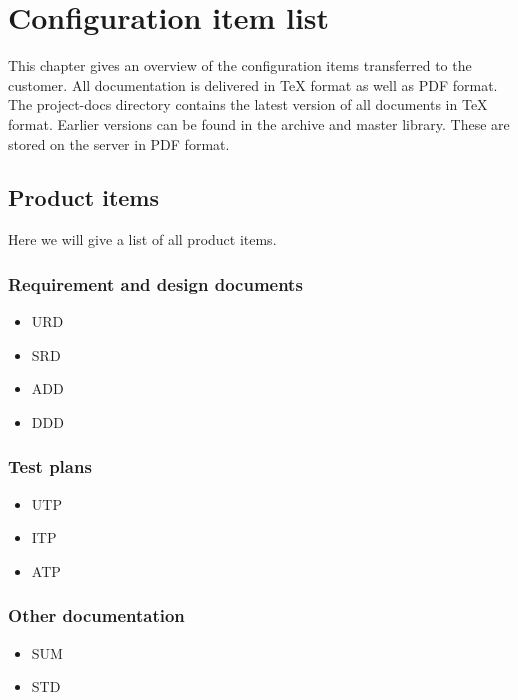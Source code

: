 \chapter{Configuration item list}
\label{chap:conf}
This chapter gives an overview of the configuration items transferred to the customer. All
documentation is delivered in \TeX{} format as well as PDF format. The project-docs directory
contains the latest version of all documents in \TeX{} format. Earlier
versions can be found in the archive and master library. These are stored on the \projectname{} 
server in PDF format.

\section{Product items}
\label{sec:prodItems}

Here we will give a list of all product items.

\subsection{Requirement and design documents}
\begin{itemize}
\item URD \cite{urd}
\item SRD \cite{srd}
\item ADD \cite{add}
\item DDD \cite{ddd}
\end{itemize}

\subsection{Test plans}
\begin{itemize}
\item UTP \cite{utp}
\item ITP \cite{itp}
\item ATP \cite{atp}
\end{itemize}

\subsection{Other documentation}
\begin{itemize}
\item SUM \cite{sum}
\item STD \cite {std}
\end{itemize}


